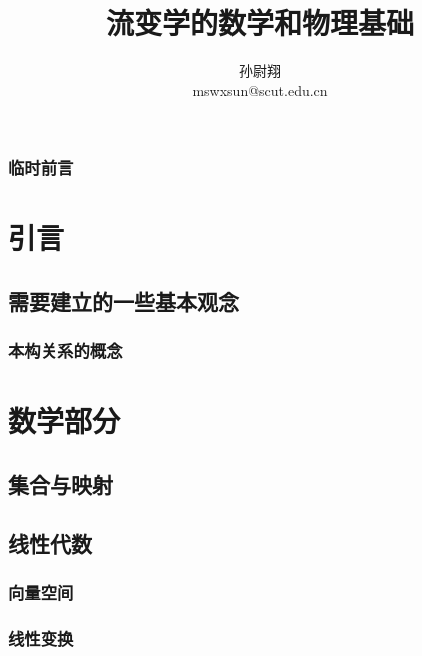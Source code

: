 \documentclass[
  zihao=5,
  a4paper,
  heading=true,
  twoside
]{ctexbook}
\title{流变学的数学和物理基础}
\author{孙尉翔\\mswxsun@scut.edu.cn}
\theoremstyle{definition}
\theoremstyle{plain}
\begin{document}
\maketitle

\frontmatter
{}
\section*{临时前言}\label{sec:preface}


\tableofcontents
\mainmatter
{}

\part{引言}
\chapter{需要建立的一些基本观念}\label{sec:I}
\section{本构关系的概念}\label{sec:I.1}
\label{sec:I.1.1}

\part{数学部分}\label{sec:II}
\chapter{集合与映射}\label{sec:II.1}
\label{sec:II.1.1}
\label{sec:II.1.2}
\label{sec:II.1.3}

\chapter{线性代数}\label{sec:II.2}
\section{向量空间}\label{sec:II.2.1}


\section{线性变换}\label{sec:II.2.2}
\end{document}
